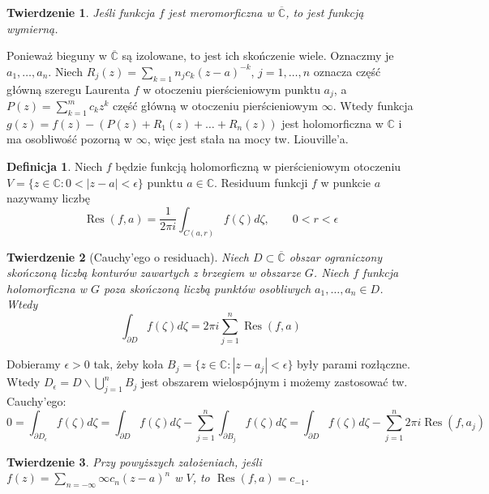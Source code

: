\documentclass[11pt]{article}
\newcommand{\abs}[1]{\left|#1\right|} %
\newcommand{\extcomplex}{\overline{\mathbb{C}}} %
\newcommand{\res}{\mathop{\text{Res}}\limits} %
\theoremstyle{plain}
\newtheorem*{theorem}{Twierdzenie}
\theoremstyle{definition}
\newtheorem*{definition}{Definicja}
\theoremstyle{remark}
\let\oldendproof\endproof
\renewenvironment{proof}[1][\proofname]{
  \oldproof[\textsc{\small #1}]
}{\oldendproof}
\begin{document}
\begin{theorem}
  Jeśli funkcja $f$ jest meromorficzna w $ \extcomplex $, to jest funkcją wymierną.
\end{theorem}

\begin{proof}
  Ponieważ bieguny w $ \extcomplex $ są izolowane, to jest ich skończenie wiele.
  Oznaczmy je $ a_1, \dots, a_n $.
  Niech $ R_j(z) = \sum_{k=1}{n_j} c_{k} (z-a)^{-k} $, $ j = 1, \dots, n $ oznacza część główną szeregu Laurenta $ f $ w otoczeniu pierścieniowym punktu $ a_j $,
  a $ P(z) = \sum_{k=1}^{m} c_k z^k $ część główną w otoczeniu pierścieniowym $ \infty $.
  Wtedy funkcja $ g(z) = f(z) - (P(z) + R_1(z) + \dots + R_n(z)) $ jest holomorficzna w $ \mathbb{C} $ i ma osobliwość pozorną w $ \infty $,
  więc jest stała na mocy tw. Liouville'a.
\end{proof}

\begin{definition}
  Niech $ f $ będzie funkcją holomorficzną w pierścieniowym otoczeniu $ V = \{z \in \mathbb{C}\colon 0 < \abs{z-a} < \epsilon \} $ punktu $ a \in \mathbb{C} $.
  Residuum funkcji $ f $ w punkcie $ a $ nazywamy liczbę
  $$
    \res(f, a) = \frac{1}{2 \pi i} \int_{C(a, r)} f(\zeta) d\zeta,
    \qquad
    0 < r < \epsilon
  $$
\end{definition}

\begin{theorem}[Cauchy’ego o residuach]
  Niech $ D \subset \extcomplex $ obszar ograniczony skończoną liczbą konturów zawartych z brzegiem w obszarze $ G $.
  Niech $ f $ funkcja holomorficzna w $ G $ poza skończoną liczbą punktów osobliwych $ a_1, \dots, a_n \in D $.
  Wtedy
  $$
    \int_{\partial D} f(\zeta) d\zeta = 2 \pi i \sum_{j=1}^n \res(f, a)
  $$ 
\end{theorem}

\begin{proof}
  Dobieramy $ \epsilon > 0 $ tak, żeby koła $ B_j = \{ z \in \mathbb{C}: \abs{z - a_j} < \epsilon \} $ były parami rozłączne.
  Wtedy $ D_{\epsilon} = D\backslash\bigcup\limits_{j=1}^{n} B_j $ jest obszarem wielospójnym i możemy zastosować tw. Cauchy'ego:
  $$
    0
    = \int_{\partial D_{\epsilon}} f(\zeta) d\zeta
    = \int_{\partial D} f(\zeta) d\zeta - \sum_{j=1}^{n} \int_{\partial B_j} f(\zeta) d\zeta
    = \int_{\partial D} f(\zeta) d\zeta - \sum_{j=1}^{n} 2 \pi i \res(f, a_j)
  $$
\end{proof}

\begin{theorem}
  Przy powyższych założeniach, jeśli $ f(z) = \sum_{n=-\infty}{\infty} c_n (z-a)^n $ w $ V $, to $ \res(f, a) = c_{-1} $.
\end{theorem}
\end{document}
